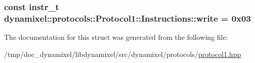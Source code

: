 \subsubsection[{\texorpdfstring{write}{write}}]{\setlength{\rightskip}{0pt plus 5cm}const {\bf instr\+\_\+t} dynamixel\+::protocols\+::\+Protocol1\+::\+Instructions\+::write = 0x03\hspace{0.3cm}{\ttfamily [static]}}\hypertarget{structdynamixel_1_1protocols_1_1_protocol1_1_1_instructions_ac41fa9bb55c7a922e39d12b120cd9e51}{}\label{structdynamixel_1_1protocols_1_1_protocol1_1_1_instructions_ac41fa9bb55c7a922e39d12b120cd9e51}


The documentation for this struct was generated from the following file\+:\begin{DoxyCompactItemize}
\item 
/tmp/doc\+\_\+dynamixel/libdynamixel/src/dynamixel/protocols/\hyperlink{protocol1_8hpp}{protocol1.\+hpp}\end{DoxyCompactItemize}
